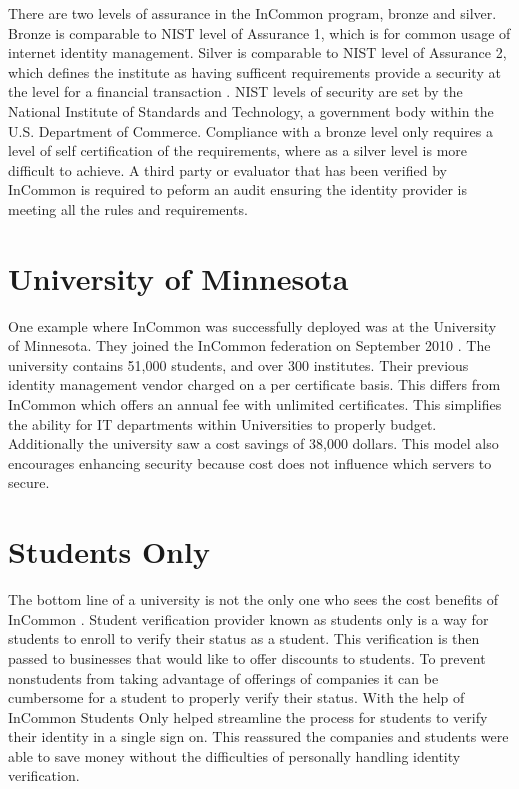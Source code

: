 \documentclass[9pt,twocolumn,twoside]{../../styles/osajnl}
\begin{document}
There are two levels of assurance in the InCommon program, bronze and
silver.  Bronze is comparable to NIST level of Assurance 1, which is
for common usage of internet identity management.  Silver is
comparable to NIST level of Assurance 2, which defines the institute
as having sufficent requirements provide a security at the level for a
financial transaction \cite{www-levels}.  NIST levels of security are
set by the National Institute of Standards and Technology, a
government body within the U.S. Department of Commerce\cite{www-nist}.
Compliance with a bronze level only requires a level of self
certification of the requirements, where as a silver level is more
difficult to achieve.  A third party or evaluator that has been
verified by InCommon is required to peform an audit ensuring the
identity provider is meeting all the rules and requirements.

\section{University of Minnesota}

One example where InCommon was successfully deployed was at the
University of Minnesota.  They joined the InCommon federation on
September 2010 \cite{www-casestudy1}.  The university contains 51,000
students, and over 300 institutes.  Their previous identity management
vendor charged on a per certificate basis.  This differs from InCommon
which offers an annual fee with unlimited certificates.  This
simplifies the ability for IT departments within Universities to
properly budget.  Additionally the university saw a cost savings of
38,000 dollars.  This model also encourages enhancing security because
cost does not influence which servers to secure.

\section{Students Only}

The bottom line of a university is not the only one who sees the cost
benefits of InCommon \cite{www-casestudy2}.  Student verification
provider known as students only is a way for students to enroll to
verify their status as a student.  This verification is then passed to
businesses that would like to offer discounts to students.  To prevent
nonstudents from taking advantage of offerings of companies
it can be cumbersome for a student to properly verify their status.
With the help of InCommon Students Only helped streamline the process
for students to verify their identity in a single sign on.  This
reassured the companies and students were able to save money without
the difficulties of personally handling identity verification.
\end{document}
